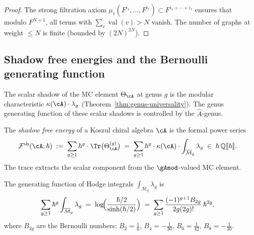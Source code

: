 \begin{proof}
The strong filtration axiom
$\mu_r(F^{i_1}, \ldots, F^{i_r}) \subset
F^{i_1 + \cdots + i_r}$
ensures that modulo $F^{N+1}$, all terms with
$\sum_v \operatorname{val}(v) > N$ vanish.  The number of
graphs at weight $\leq N$ is finite (bounded by $(2N)^{2N}$).
\end{proof}

%
%

\subsection{Shadow free energies and the Bernoulli generating
function}
\label{subsec:thqg-I-shadow-free-energies}

The scalar shadow of the MC element $\Theta_\cA$ at genus $g$
is the modular characteristic $\kappa(\cA) \cdot \lambda_g$
(Theorem~\ref{thm:genus-universality}).  The genus generating
function of these scalar shadows is controlled by the
$\hat{A}$-genus.

\begin{definition}%
\label{def:g1-shadow-free-energy}%
%
The \emph{shadow free energy} of a Koszul chiral algebra
$\cA$ is the formal power series
\begin{equation}\label{eq:g1-shadow-free-energy}
\mathcal{F}^{\mathrm{sh}}(\cA;\hbar)
\;:=\;
\sum_{g \geq 1} \hbar^g \cdot
\Tr\bigl(\Theta_\cA^{(g)}\bigr)
\;=\;
\sum_{g \geq 1} \hbar^g \cdot \kappa(\cA) \cdot
\int_{\overline{\mathcal{M}}_g} \lambda_g
\;\in\;
\hbar\,\mathbb{Q}[\![\hbar]\!].
\end{equation}
The trace extracts the scalar component from the
$\gAmod$-valued MC element.
\end{definition}

\begin{theorem}%
\label{thm:g1-ahat-generating}%
%
%
The generating function of Hodge integrals
$\int_{\overline{\mathcal{M}}_g} \lambda_g$ is
\begin{equation}\label{eq:g1-ahat-gf}
\sum_{g \geq 1} \hbar^g
\int_{\overline{\mathcal{M}}_g} \lambda_g
\;=\;
\log\!\Bigl(
\frac{\hbar/2}{\sinh(\hbar/2)}
\Bigr)
\;=\;
\sum_{g \geq 1}
\frac{(-1)^{g+1} B_{2g}}{2g(2g)!}\,\hbar^{2g},
\end{equation}
where $B_{2g}$ are the Bernoulli numbers:
$B_2 = \tfrac{1}{6}$, $B_4 = -\tfrac{1}{30}$,
$B_6 = \tfrac{1}{42}$, $B_8 = -\tfrac{1}{30}$.
\end{theorem}

